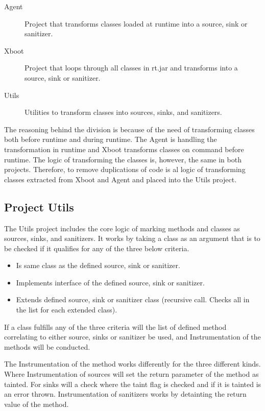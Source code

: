 \hfill
\begin{description}
    \item[Agent] Project that transforms classes loaded at runtime into a source, sink or sanitizer.
    \item[Xboot] Project that loops through all classes in rt.jar and transforms into a source, sink or sanitizer.
    \item[Utils] Utilities to transform classes into sources, sinks, and sanitizers. 
\end{description}
\hfill

The reasoning behind the division is because of the need of transforming classes both before runtime and during runtime. The Agent is handling the transformation in runtime and Xboot transforms classes on command before runtime. The logic of transforming the classes is, however, the same in both projects. Therefore, to remove duplications of code is al logic of transforming classes extracted from Xboot and Agent and placed into the Utils project.


\subsection{Project Utils}
The Utils project includes the core logic of marking methods and classes as sources, sinks, and sanitizers. It works by taking a class as an argument that is to be checked if it qualifies for any of the three below criteria.

\hfill
\begin{itemize}
    \item Is same class as the defined source, sink or sanitizer.
    \item Implements interface of the defined source, sink or sanitizer.
    \item Extends defined source, sink or sanitizer class (recursive call. Checks all in the list for each extended class). 
\end{itemize}
\hfill

If a class fulfills any of the three criteria will the list of defined method correlating to either source, sinks or sanitizer be used, and Instrumentation of the methods will be conducted.

The Instrumentation of the method works differently for the three different kinds. Where Instrumentation of sources will set the return parameter of the method as tainted. For sinks will a check where the taint flag is checked and if it is tainted is an error thrown. Instrumentation of sanitizers works by detainting the return value of the method.


